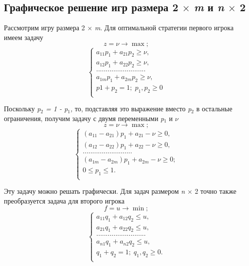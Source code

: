 \subsection{Графическое решение игр размера 2 $\times$ \emph{m} и \emph{n} $\times$ 2}

Рассмотрим игру размера 2 $\times$ \emph{m}. Для оптимальной стратегии первого игрока имеем задачу
\begin{equation}
\label{equation_4_14}
z = \nu \to \max;
\end{equation}
\begin{equation}
\label{equation_4_15}
\begin{cases}
a_{11}p_{1} + a_{21}p_{2} \geqslant \nu, \\
a_{12}p_{1} + a_{22}p_{2} \geqslant \nu, \\
.......................... \\
a_{1m}p_{1} + a_{2m}p_{2} \geqslant \nu, \\
p{1} + p_{2} = 1; \; p_{1}, p_{2} \geqslant 0 \\
\end{cases}
\end{equation}


Поскольку \emph{p$_{2}$ = 1 - p$_{1}$,} то, подставляя это выражение вместо \emph{p$_{2}$} в остальные ограничения, получим задачу с двумя переменными \emph{p$_{1}$} и $\nu$
\begin{equation}
\label{equation_4_16}
z = \nu \to \max;
\end{equation}
\begin{equation}
\label{equation_4_17}
\begin{cases}
(a_{11} - a_{21})p_{1} + a_{21} - \nu \geqslant 0,  \\
(a_{12} - a_{22})p_{1} + a_{22} - \nu \geqslant 0,  \\
.......................... \\
(a_{1m} - a_{2m})p_{1} + a_{2m} - \nu \geqslant 0;  \\
0 \leqslant p_{1} \leqslant 1. \\
\end{cases}
\end{equation}


Эту задачу можно решать графически. Для задач размером \emph{n} $\times$ 2 точно также преобразуется задача для второго игрока
\begin{equation}
\label{equation_4_18}
f = u \to \min;
\end{equation}
\begin{equation}
\label{equation_4_19}
\begin{cases}
a_{11}q_{1} + a_{12}q_{2} \leqslant u,  \\
a_{21}q_{1} + a_{22}q_{2} \leqslant u,  \\
.......................... \\
a_{n1}q_{1} + a_{n2}q_{2} \leqslant u,  \\
q_{1} + q_{2} = 1; \; q_{1}, q_{2} \geqslant 0. \\
\end{cases}
\end{equation}


